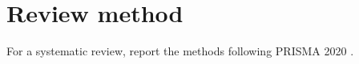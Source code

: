\section{Review method}\label{sec:review-method}
For a systematic review, report the methods following PRISMA 2020 \citep{page2021}.
